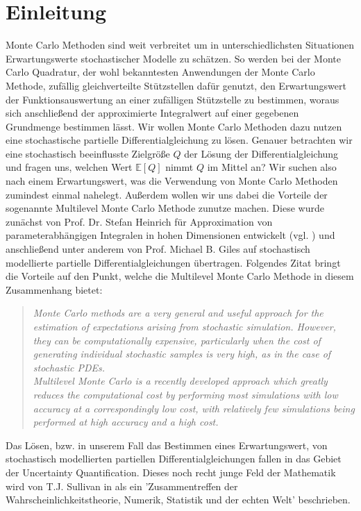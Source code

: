 
\section{Einleitung}

Monte Carlo Methoden sind weit verbreitet um in unterschiedlichsten Situationen Erwartungswerte stochastischer Modelle zu schätzen.
So werden bei der Monte Carlo Quadratur, der wohl bekanntesten Anwendungen der Monte Carlo Methode, zufällig gleichverteilte Stützstellen dafür genutzt, den Erwartungswert der Funktionsauswertung an einer zufälligen Stützstelle zu bestimmen, woraus sich anschließend der approximierte Integralwert auf einer gegebenen Grundmenge bestimmen lässt. 
Wir wollen Monte Carlo Methoden dazu nutzen eine stochastische partielle Differentialgleichung zu lösen. 
Genauer betrachten wir eine stochastisch beeinflusste Zielgröße $ Q $ der Lösung der Differentialgleichung und fragen uns, welchen Wert $ \mathbb{E}[Q] $ nimmt $ Q $ im Mittel an? Wir suchen also nach einem Erwartungswert, was die Verwendung von Monte Carlo Methoden zumindest einmal nahelegt. 
Außerdem wollen wir uns dabei die Vorteile der sogenannte Multilevel Monte Carlo Methode zunutze machen. Diese wurde zunächst von Prof. Dr. Stefan Heinrich für Approximation von parameterabhängigen Integralen in hohen Dimensionen entwickelt (vgl. \cite{heinrich2001multilevel}) und anschließend unter anderem von Prof. Michael B. Giles auf stochastisch modellierte partielle Differentialgleichungen übertragen. Folgendes Zitat bringt die Vorteile auf den Punkt, welche die Multilevel Monte Carlo Methode in diesem Zusammenhang bietet:
\begin{quote}
	\textit{Monte Carlo methods are a very general and useful approach for the estimation of expectations arising from stochastic simulation. However, they can be computationally expensive, particularly when the cost of generating individual stochastic samples is very high, as in the case of stochastic PDEs. \\ Multilevel Monte Carlo is a recently developed approach which greatly reduces the computational cost by performing most simulations with low accuracy at a correspondingly low cost, with relatively few simulations being performed at high accuracy and a high cost.}  \\
\end{quote}
Das Lösen, bzw. in unserem Fall das Bestimmen eines Erwartungswert, von stochastisch modellierten partiellen Differentialgleichungen fallen in das Gebiet der Uncertainty Quantification. Dieses noch recht junge Feld der Mathematik wird von T.J. Sullivan in \cite{sullivan2015introduction} als ein 'Zusammentreffen der Wahrscheinlichkeitstheorie, Numerik, Statistik und der echten Welt' beschrieben. \\
